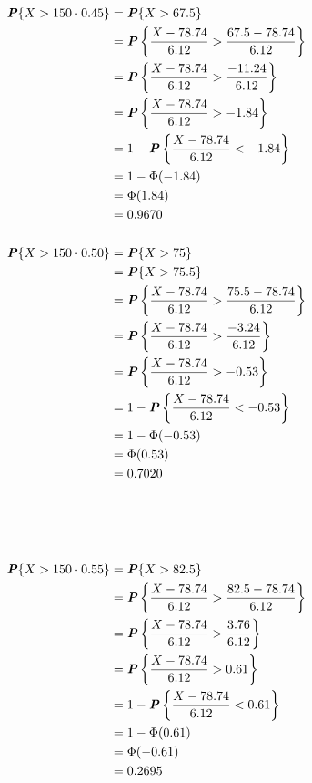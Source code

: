 \documentclass[12pt]{article}
\newcommand{\boldP}{\textbf{\textit{P}}}
\begin{document}
\begin{align*}
  \boldP\{X > 150 \cdot 0.45\}
    &= \boldP\{X > 67.5\} \\
    &= \boldP \left\{ \frac{X - 78.74}{6.12}
                    > \frac{67.5 - 78.74}{6.12} \right\} \\
    &= \boldP \left\{ \frac{X - 78.74}{6.12}
                    > \frac{-11.24}{6.12} \right\} \\
    &= \boldP \left\{ \frac{X - 78.74}{6.12} > -1.84 \right\} \\
    &= 1 - \boldP \left\{ \frac{X - 78.74}{6.12} < -1.84 \right\} \\
    &= 1 - \Phi(-1.84) \\
    &= \Phi(1.84) \\
    &= 0.9670 \\
\\
  \boldP\{X > 150 \cdot 0.50\}
    &= \boldP\{X > 75\} \\
    &= \boldP\{X > 75.5\} \\
    &= \boldP \left\{ \frac{X - 78.74}{6.12}
                    > \frac{75.5 - 78.74}{6.12} \right\} \\
    &= \boldP \left\{ \frac{X - 78.74}{6.12}
                    > \frac{-3.24}{6.12} \right\} \\
    &= \boldP \left\{ \frac{X - 78.74}{6.12} > -0.53 \right\} \\
    &= 1 - \boldP \left\{ \frac{X - 78.74}{6.12} < -0.53 \right\} \\
    &= 1 - \Phi(-0.53) \\
    &= \Phi(0.53) \\
    &= 0.7020 \\
\\ \\ \\ \\
  \boldP\{X > 150 \cdot 0.55\}
    &= \boldP\{X > 82.5\} \\
    &= \boldP \left\{ \frac{X - 78.74}{6.12}
                    > \frac{82.5 - 78.74}{6.12} \right\} \\
    &= \boldP \left\{ \frac{X - 78.74}{6.12}
                    > \frac{3.76}{6.12} \right\} \\
    &= \boldP \left\{ \frac{X - 78.74}{6.12} > 0.61 \right\} \\
    &= 1 - \boldP \left\{ \frac{X - 78.74}{6.12} < 0.61 \right\} \\
    &= 1 - \Phi(0.61) \\
    &= \Phi(-0.61) \\
    &= 0.2695
\end{align*}
\end{document}
